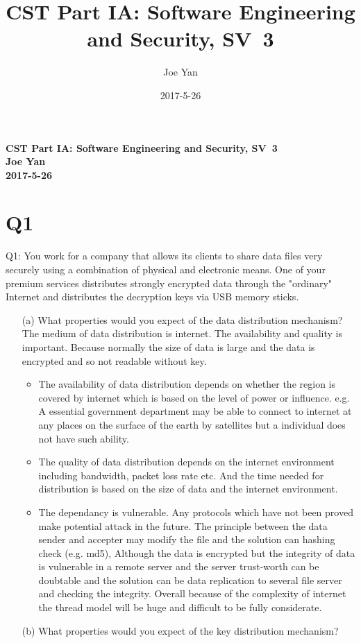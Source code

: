 \documentclass[10pt,twoside,a4paper]{article}
\newcommand{\studentname}{Joe Yan}
\newcommand{\svworkdate}{2017-5-26}
\newcommand{\svcourse}{CST Part IA: Software Engineering and Security}
\newcommand{\svnumber}{3}
\begin{document}
\author{\studentname}
\title{\svcourse, SV~\svnumber}
\date{\svworkdate}

\textbf{\svcourse, SV~\svnumber}\\
\textbf{\studentname}\\
\textbf{\svworkdate}\\
\section*{Q1}
Q1: You work for a company that allows its clients to share data files very securely using a combination of physical and electronic means. One of your premium services distributes strongly encrypted data through the "ordinary" Internet and distributes the decryption keys via USB memory sticks.
\begin{itemize}
\item[(a)] 
What properties would you expect of the data distribution mechanism?\\
The medium of data distribution is internet. The availability and quality is important. Because normally the size of data is large and the data is encrypted and so not readable without key.
\begin{itemize}
\item The availability of data distribution depends on whether the region is covered by internet which is based on the level of power or influence. e.g. A essential government department may be able to connect to internet at any places on the surface of the earth by satellites but a individual does not have such ability.
\item The quality of data distribution depends on the internet environment including bandwidth, packet loss rate etc. And the time needed for distribution is based on the size of data and the internet environment.
\item The dependancy is vulnerable. Any protocols which have not been proved make potential attack in the future. The principle between the data sender and accepter may modify the file and the solution can hashing check (e.g. md5), Although the data is encrypted but the integrity of data is vulnerable in a remote server and the server trust-worth can be doubtable and the solution can be data replication to several file server and checking the integrity. Overall because of the complexity of internet the thread model will be huge and difficult to be fully considerate.
\end{itemize}
\item[(b)] What properties would you expect of the key distribution mechanism?\\

\end{itemize}
\end{document}
